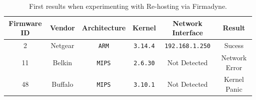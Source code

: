 \begin{table}[h]
\centering
\caption{First results when experimenting with Re-hosting via Firmadyne.}
\begin{tabular}{cccccc}
\hline
\textbf{Firmware ID} & \textbf{Vendor} & \textbf{Architecture} & \textbf{Kernel} & \textbf{Network Interface} & \textbf{Result} \\ \hline
2                    & Netgear         & {\tt ARM}                   & {\tt 3.14.4}                  & {\tt 192.168.1.250}                       &  Sucess                          \\
11                   & Belkin          & {\tt MIPS}                  & {\tt 2.6.30}                 & Not Detected                        &    Network Error                       \\
48                   & Buffalo         & {\tt MIPS}                 & {\tt 3.10.1}                 & Not Detected                        &        Kernel Panic                    \\ \hline
\end{tabular}
\label{tab:fist-rehosting}
\end{table}


